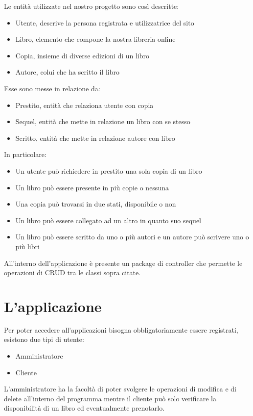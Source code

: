 \documentclass[a4paper,10pt]{article}
\begin{document}
Le entità utilizzate nel nostro progetto sono così descritte:

\begin{itemize}
	\item Utente, descrive la persona registrata e utilizzatrice del sito
	\item Libro, elemento che compone la nostra libreria online
	\item Copia, insieme di diverse edizioni di un libro
	\item Autore, colui che ha scritto il libro
\end{itemize}

Esse sono messe in relazione da:
\begin{itemize}
	\item Prestito, entità che relaziona utente con copia
	\item Sequel, entità che mette in relazione un libro con se stesso
	\item Scritto, entità che mette in relazione autore con libro
\end{itemize}

In particolare:
\begin{itemize}
	\item Un utente può richiedere in prestito una sola copia di un libro
	\item Un libro può essere presente in più copie o nessuna
	\item Una copia può trovarsi in due stati, disponibile o non
	\item Un libro può essere collegato ad un altro in quanto suo sequel
	\item Un libro può essere scritto da uno o più autori e un autore può scrivere uno o più libri
\end{itemize}

All’interno dell’applicazione è presente un package di controller che permette le operazioni di CRUD tra le classi sopra citate.

\section*{L'applicazione}
Per poter accedere all’applicazioni bisogna obbligatoriamente essere registrati, esistono due tipi di utente:

\begin{itemize}
	\item Amministratore
	\item Cliente
\end{itemize}

L’amministratore ha la facoltà di poter svolgere le operazioni di modifica e di delete all’interno del programma mentre il cliente può solo verificare la disponibilità di un libro ed eventualmente prenotarlo.
\end{document}
